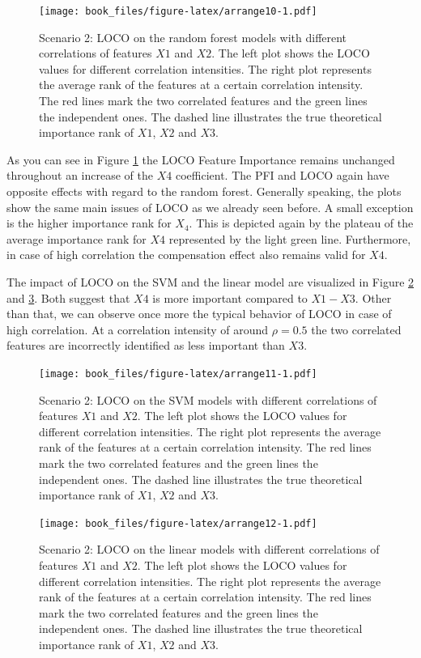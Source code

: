 \documentclass[]{krantz}
\begin{document}
\begin{figure}
\centering
\texttt{[image: book\_files/figure-latex/arrange10-1.pdf]}
\caption{\label{fig:arrange10}Scenario 2: LOCO on the random forest models
with different correlations of features \(X1\) and \(X2\). The left plot
shows the LOCO values for different correlation intensities. The right
plot represents the average rank of the features at a certain
correlation intensity. The red lines mark the two correlated features
and the green lines the independent ones. The dashed line illustrates
the true theoretical importance rank of \(X1\), \(X2\) and \(X3\).}
\end{figure}

As you can see in Figure \ref{fig:arrange10} the LOCO Feature Importance
remains unchanged throughout an increase of the \(X4\) coefficient. The
PFI and LOCO again have opposite effects with regard to the random
forest. Generally speaking, the plots show the same main issues of LOCO
as we already seen before. A small exception is the higher importance
rank for \(X_4\). This is depicted again by the plateau of the average
importance rank for \(X4\) represented by the light green line.
Furthermore, in case of high correlation the compensation effect also
remains valid for \(X4\).

The impact of LOCO on the SVM and the linear model are visualized in
Figure \ref{fig:arrange11} and \ref{fig:arrange12}. Both suggest that
\(X4\) is more important compared to \(X1 - X3\). Other than that, we
can observe once more the typical behavior of LOCO in case of high
correlation. At a correlation intensity of around \(\rho=0.5\) the two
correlated features are incorrectly identified as less important than
\(X3\).

\begin{figure}
\centering
\texttt{[image: book\_files/figure-latex/arrange11-1.pdf]}
\caption{\label{fig:arrange11}Scenario 2: LOCO on the SVM models with
different correlations of features \(X1\) and \(X2\). The left plot
shows the LOCO values for different correlation intensities. The right
plot represents the average rank of the features at a certain
correlation intensity. The red lines mark the two correlated features
and the green lines the independent ones. The dashed line illustrates
the true theoretical importance rank of \(X1\), \(X2\) and \(X3\).}
\end{figure}

\begin{figure}
\centering
\texttt{[image: book\_files/figure-latex/arrange12-1.pdf]}
\caption{\label{fig:arrange12}Scenario 2: LOCO on the linear models with
different correlations of features \(X1\) and \(X2\). The left plot
shows the LOCO values for different correlation intensities. The right
plot represents the average rank of the features at a certain
correlation intensity. The red lines mark the two correlated features
and the green lines the independent ones. The dashed line illustrates
the true theoretical importance rank of \(X1\), \(X2\) and \(X3\).}
\end{figure}
\end{document}
